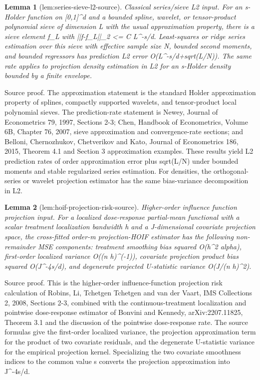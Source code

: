 \documentclass{article}
\newtheorem{lemma}{Lemma}
\begin{document}
\begin{lemma}[lem:series-sieve-l2-source]\label{lem:series-sieve-l2-source}
Classical series/sieve L2 input. For an s-Holder function on [0,1]^d and a bounded spline, wavelet, or tensor-product polynomial sieve of dimension L with the usual approximation property, there is a sieve element f_L with ||f-f_L||_2 <= C L^{-s/d}. Least-squares or ridge series estimation over this sieve with effective sample size N, bounded second moments, and bounded regressors has prediction L2 error O(L^{-s/d}+sqrt(L/N)). The same rate applies to projection density estimation in L2 for an s-Holder density bounded by a finite envelope.
\end{lemma}
Source proof. The approximation statement is the standard Holder approximation property of splines, compactly supported wavelets, and tensor-product local polynomial sieves. The prediction-rate statement is Newey, Journal of Econometrics 79, 1997, Sections 2-3; Chen, Handbook of Econometrics, Volume 6B, Chapter 76, 2007, sieve approximation and convergence-rate sections; and Belloni, Chernozhukov, Chetverikov and Kato, Journal of Econometrics 186, 2015, Theorem 4.1 and Section 3 approximation examples. These results yield L2 prediction rates of order approximation error plus sqrt(L/N) under bounded moments and stable regularized series estimation. For densities, the orthogonal-series or wavelet projection estimator has the same bias-variance decomposition in L2.

\begin{lemma}[lem:hoif-projection-risk-source]\label{lem:hoif-projection-risk-source}
Higher-order influence function projection input. For a localized dose-response partial-mean functional with a scalar treatment localization bandwidth h and a J-dimensional covariate projection space, the cross-fitted order-m projection-HOIF estimator has the following non-remainder MSE components: treatment smoothing bias squared O(h^{2 alpha}), first-order localized variance O((n h)^(-1)), covariate projection product bias squared O(J^{-4s/d}), and degenerate projected U-statistic variance O(J/(n h)^2).
\end{lemma}
Source proof. This is the higher-order influence-function projection risk calculation of Robins, Li, Tchetgen Tchetgen and van der Vaart, IMS Collections 2, 2008, Sections 2-3, combined with the continuous-treatment localization and pointwise dose-response estimator of Bonvini and Kennedy, arXiv:2207.11825, Theorem 3.1 and the discussion of the pointwise dose-response rate. The source formulas give the first-order localized variance, the projection approximation term for the product of two covariate residuals, and the degenerate U-statistic variance for the empirical projection kernel. Specializing the two covariate smoothness indices to the common value s converts the projection approximation into J^{-4s/d}.
\end{document}
